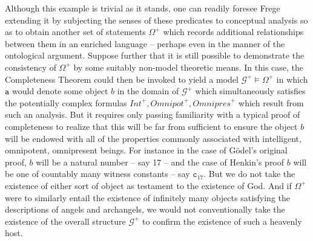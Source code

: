\documentclass[11pt,fleqn,leqno]{article}
\begin{document}
Although this example is trivial as it stands, one can readily foresee Frege extending it by subjecting the senses of these predicates to conceptual analysis so as to obtain another set of statements $\Omega^+$ which records additional relationships between them in an enriched language -- perhaps even in the manner of the ontological argument.  Suppose further that it is still possible to demonstrate the consistency of $\Omega^+$ by some suitably non-model theoretic means.    In this case, the Completeness Theorem could then be invoked to yield a model $\mathcal{G}^+ \models \Omega^+$ in which $\texttt{a}$ would denote some object $b$ in the domain of $\mathcal{G}^+$ which simultaneously satisfies the potentially complex formulas $\mathit{Int}^+,\mathit{Omnipot}^+,\mathit{Omnipres}^+$ which result from such an analysis.    But it requires only passing familiarity with a typical proof of completeness to realize that this will be far from sufficient to ensure the object $b$ will be endowed with all of the properties commonly associated with intelligent, omnipotent, omnipresent beings.  For instance in the case of G\"odel's original proof, $b$ will be a natural number -- say 17 -- and the case of Henkin's \citeyearpar{Henkin1949} proof $b$ will be one of countably many witness constants -- say $\texttt{c}_{17}$.   But  we do not take the existence of either sort of object as testament to the existence of God.   And if $\Omega^+$ were to similarly entail the existence of infinitely many objects satisfying  the descriptions of angels and archangels,  we would not conventionally take the existence of the overall structure $\mathcal{G}^+$ to confirm the existence of such a heavenly host.   
\end{document}

